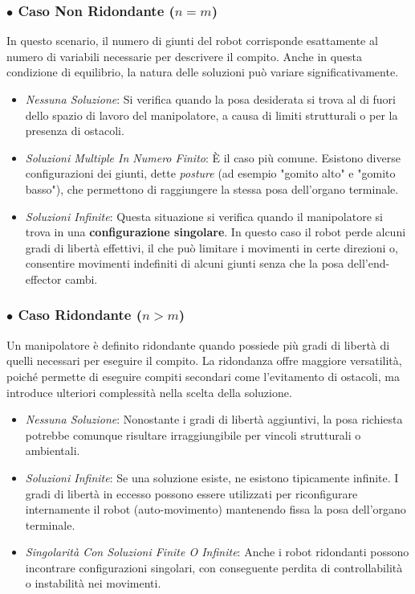 ﻿\documentclass[11pt, a4paper]{article}
\begin{document}
\subsubsection*{\(\bullet\) Caso Non Ridondante ($n = m$)}
In questo scenario, il numero di giunti del robot corrisponde esattamente al numero di variabili necessarie per descrivere il compito. Anche in questa condizione di equilibrio, la natura delle soluzioni può variare significativamente.
\begin{itemize}
    \item \textit{Nessuna Soluzione}: Si verifica quando la posa desiderata si trova al di fuori dello spazio di lavoro del manipolatore, a causa di limiti strutturali o per la presenza di ostacoli.
    \item \textit{Soluzioni Multiple In Numero Finito}: È il caso più comune. Esistono diverse configurazioni dei giunti, dette \textit{posture} (ad esempio "gomito alto" e "gomito basso"), che permettono di raggiungere la stessa posa dell'organo terminale.
    \item \textit{Soluzioni Infinite}: Questa situazione si verifica quando il manipolatore si trova in una \textbf{configurazione singolare}. In questo caso il robot perde alcuni gradi di libertà effettivi, il che può limitare i movimenti in certe direzioni o, consentire movimenti indefiniti di alcuni giunti senza che la posa dell'end-effector cambi.
\end{itemize}

\subsubsection*{\(\bullet\) Caso Ridondante ($n > m$)}
Un manipolatore è definito ridondante quando possiede più gradi di libertà di quelli  necessari per eseguire il compito. La ridondanza offre maggiore versatilità, poiché permette di eseguire compiti secondari come l'evitamento di ostacoli, ma introduce ulteriori complessità nella scelta della soluzione.
\begin{itemize}
    \item \textit{Nessuna Soluzione}: Nonostante i gradi di libertà aggiuntivi, la posa richiesta potrebbe comunque risultare irraggiungibile per vincoli strutturali o ambientali.
    \item \textit{Soluzioni Infinite}: Se una soluzione esiste, ne esistono tipicamente infinite. I gradi di libertà in eccesso possono essere utilizzati per riconfigurare internamente il robot (auto-movimento) mantenendo fissa la posa dell'organo terminale.
    \item \textit{Singolarità Con Soluzioni Finite O Infinite}: Anche i robot ridondanti possono incontrare configurazioni singolari, con conseguente perdita di controllabilità o instabilità nei movimenti.
\end{itemize}
\end{document}
